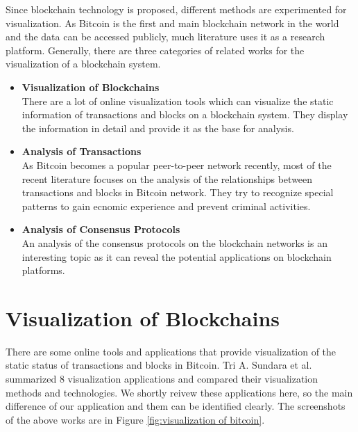 Since blockchain technology is proposed, different methods are experimented for visualization. As Bitcoin is the first and main blockchain network in the world and the data can be accessed publicly, much literature uses it as a research platform. Generally, there are three categories of related works for the visualization of a blockchain system.
\begin{itemize}
    \item \textbf{Visualization of Blockchains} \\
        There are a lot of online visualization tools which can visualize the static information of transactions and blocks on a blockchain system. They display the information in detail and provide it as the base for analysis.
    \item \textbf{Analysis of Transactions} \\
        As Bitcoin becomes a popular peer-to-peer network recently, most of the recent literature focuses on the analysis of the relationships between transactions and blocks in Bitcoin network. They try to recognize special patterns to gain ecnomic experience and prevent criminal activities.
    \item \textbf{Analysis of Consensus Protocols} \\
        An analysis of the consensus protocols on the blockchain networks is an interesting topic as it can reveal the potential applications on blockchain platforms.
\end{itemize}

\section{Visualization of Blockchains}

There are some online tools and applications that provide visualization of the static status of transactions and blocks in Bitcoin. Tri A. Sundara et al. \cite{Sundara2017} summarized 8 visualization applications and compared their visualization methods and technologies. We shortly reivew these applications here, so the main difference of our application and them can be identified clearly. The screenshots of the above works are in Figure \ref{fig:visualization of bitcoin}.

